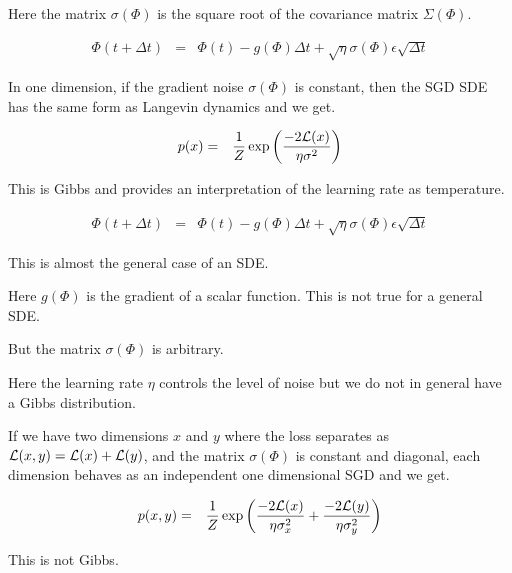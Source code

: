 {\vfill
Here the matrix $\sigma(\Phi)$ is the square root of the covariance matrix $\Sigma(\Phi)$.


\begin{eqnarray*}
\Phi(t + \Delta t) & = & \Phi(t) -g(\Phi)\Delta t + \sqrt{\eta} \sigma(\Phi) \epsilon\sqrt{\Delta t}
\end{eqnarray*}

\vfill
In one dimension, if the gradient noise $\sigma(\Phi)$ is constant, then the SGD SDE has the same form as Langevin dynamics and we get.

\begin{eqnarray*}
p(x) & = & \frac{1}{Z} \exp\left(\frac{-2{\cal L}(x)}{ \eta \sigma^2}\right)
\end{eqnarray*}

\vfill
This is Gibbs and provides an interpretation of the learning rate as temperature.



\begin{eqnarray*}
\Phi(t + \Delta t) & = & \Phi(t) -g(\Phi)\Delta t + \sqrt{\eta} \sigma(\Phi) \epsilon\sqrt{\Delta t}
\end{eqnarray*}

\vfill
This is almost the general case of an SDE.

\vfill
Here $g(\Phi)$ is the gradient of a scalar function.  This is not true for a general SDE.

\vfill
But the matrix $\sigma(\Phi)$ is arbitrary.

\vfill
Here the learning rate $\eta$ controls the level of noise but we do not in general have a Gibbs distribution.



If we have two dimensions $x$ and $y$ where the loss separates as ${\cal L}(x,y) = {\cal L}(x) + {\cal L}(y)$, and the matrix $\sigma(\Phi)$ is constant and diagonal,
each dimension behaves as an independent one dimensional SGD and we get.

\begin{eqnarray*}
p(x,y) & = & \frac{1}{Z} \exp\left(\frac{-2{\cal L}(x)}{ \eta \sigma_x^2} + \frac{-2{\cal L}(y)}{\eta \sigma_y^2}\right)
\end{eqnarray*}

\vfill
This is not Gibbs.





}
